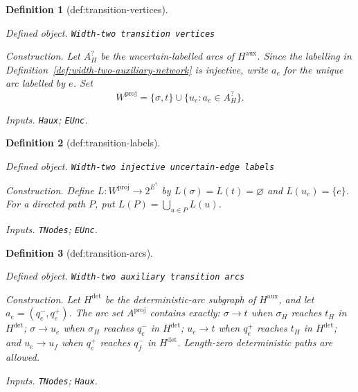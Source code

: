 \documentclass{article}
\newtheorem{definition}{Definition}
\begin{document}
\begin{definition}[def:transition-vertices]\label{def:transition-vertices}
\par\smallskip\noindent\emph{Defined object.} \texttt{Width-\allowbreak{}two transition vertices}
\par\smallskip\noindent\emph{Construction.} Let \(A_H^{?}\) be the uncertain-labelled arcs of \(H^{\mathrm{aux}}\).  Since the labelling in Definition~\ref{def:width-two-auxiliary-network} is injective, write \(a_e\) for the unique arc labelled by \(e\).  Set
\[
 W^{\mathrm{proj}}=\{\sigma,t\}\cup\{u_e:a_e\in A_H^{?}\}.
\]
\par\smallskip\noindent\emph{Inputs.} \texttt{Haux}; \texttt{EUnc}.
\end{definition}

\begin{definition}[def:transition-labels]\label{def:transition-labels}
\par\smallskip\noindent\emph{Defined object.} \texttt{Width-\allowbreak{}two injective uncertain-\allowbreak{}edge labels}
\par\smallskip\noindent\emph{Construction.} Define \(L:W^{\mathrm{proj}}\to2^{E^{?}}\) by \(L(\sigma)=L(t)=\varnothing\) and \(L(u_e)=\{e\}\).  For a directed path \(P\), put \(L(P)=\bigcup_{u\in P}L(u)\).
\par\smallskip\noindent\emph{Inputs.} \texttt{TNodes}; \texttt{EUnc}.
\end{definition}

\begin{definition}[def:transition-arcs]\label{def:transition-arcs}
\par\smallskip\noindent\emph{Defined object.} \texttt{Width-\allowbreak{}two auxiliary transition arcs}
\par\smallskip\noindent\emph{Construction.} Let \(H^{\mathrm{det}}\) be the deterministic-arc subgraph of \(H^{\mathrm{aux}}\), and let \(a_e=(q_e^-,q_e^+)\).  The arc set \(A^{\mathrm{proj}}\) contains exactly: \(\sigma\to t\) when \(\sigma_H\) reaches \(t_H\) in \(H^{\mathrm{det}}\); \(\sigma\to u_e\) when \(\sigma_H\) reaches \(q_e^-\) in \(H^{\mathrm{det}}\); \(u_e\to t\) when \(q_e^+\) reaches \(t_H\) in \(H^{\mathrm{det}}\); and \(u_e\to u_f\) when \(q_e^+\) reaches \(q_f^-\) in \(H^{\mathrm{det}}\).  Length-zero deterministic paths are allowed.
\par\smallskip\noindent\emph{Inputs.} \texttt{TNodes}; \texttt{Haux}.
\end{definition}
\end{document}
